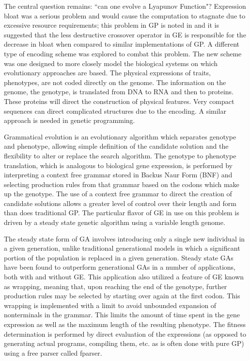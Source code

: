 \documentclass[12pt]{article}
\begin{document}
The central question remains: ``can one evolve a Lyapunov Function"?
Expression bloat was a serious problem and would cause the computation
to stagnate due to excessive resource requirements; this problem in GP is
noted in \cite{oneill:1999:hge, ryan:1998:geepal} 
and it is suggested that the less destructive
crossover operator in GE is responsible for the decrease in bloat when
compared to similar implementations of GP. A different type
of encoding scheme was explored to combat this problem.  The new
scheme was one designed to more closely model the biological systems
on which evolutionary approaches are based.  The physical expressions
of traits, phenotypes, are not coded directly on the genome.  The
information on the genome, the genotype, is translated from DNA to RNA
and then to proteins.  These proteins will direct the construction of
physical features.  Very compact sequences can direct complicated
structures due to the encoding.  A similar approach is needed in
genetic programming.

Grammatical evolution is an evolutionary algorithm which separates
genotype and phenotype, allowing simple definition of the candidate
solution and the flexibility to alter or replace the search
algorithm. The genotype to phenotype translation, which is analogous
to biological gene expression, is performed by interpreting a context
free grammar stored in Backus Naur Form (BNF) and selecting production
rules from that grammar based on the codons which make up the
genotype. The use of a context free grammar to direct the creation of
candidate solutions allows a greater level of control over their
length and form than does traditional GP. The particular flavor of GE
in use on this problem is driven by a steady state genetic algorithm
using a variable length genome. 

The steady state form of GA involves
introducing only a single new individual in a given generation, unlike
traditional generational models in which a significant portion of the
population is replaced in a given generation. Steady state GAs have
been found to outperform generational GAs in a number of applications,
both with and without GE. This application also utilized a feature of
GE known as wrapping, meaning that, upon reaching the end of the
genotype, further production rules may be selected by starting over
again at the first codon. This wrapping is implemented with a limit to
avoid unbounded expansion of nonterminals in the grammar. This limits
the amount of time spent in the gene expression as well as the maximum
length of the resulting phenotype. The fitness determination is
performed by direct evaluation of the expressions (as opposed to
generating actual programs, compiling them, etc. as is often done with
pure GP) using a free parser called fparser.
\end{document}
